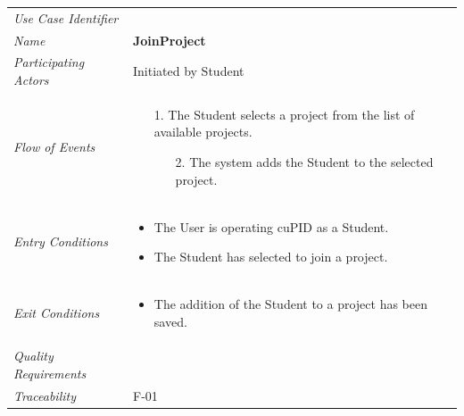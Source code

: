 \documentclass[12pt,letterpaper]{article}
\begin{document}
\begin{center}
	\begin{tabu} to 
		\toprule
		Use Case Identifier & \joinproject{} \\
		Name & {\bf JoinProject} \\
		Participating Actors & Initiated by Student \\
		Flow of Events & 
		\begin{minipage}[t]{\linewidth}
		    \begin{enumerate}[topsep=-1em, leftmargin=*]
			    \item[1.] The Student selects a project from the list of available projects.
			    \begin{enumerate}
			    		\item[2.] The system adds the Student to the selected project.
			    \end{enumerate}
			\end{enumerate}
		\end{minipage} \\

		Entry Conditions &
		\begin{minipage}[t]{\linewidth}
			\begin{itemize}[topsep=-1em, leftmargin=*]
			    \item The User is operating cuPID as a Student.
			    \item The Student has selected to join a project.
	        \end{itemize}
		\end{minipage} \\

		Exit Conditions &
		\begin{minipage}[t]{\linewidth}
			\begin{itemize}[topsep=-1em, leftmargin=*]
			    \item The addition of the Student to a project has been saved.
	        \end{itemize}
		\end{minipage} \\

		Quality Requirements & \\

		Traceability & F-01 \\
		\toprule
	\end{tabu}
\end{center}
\end{document}
